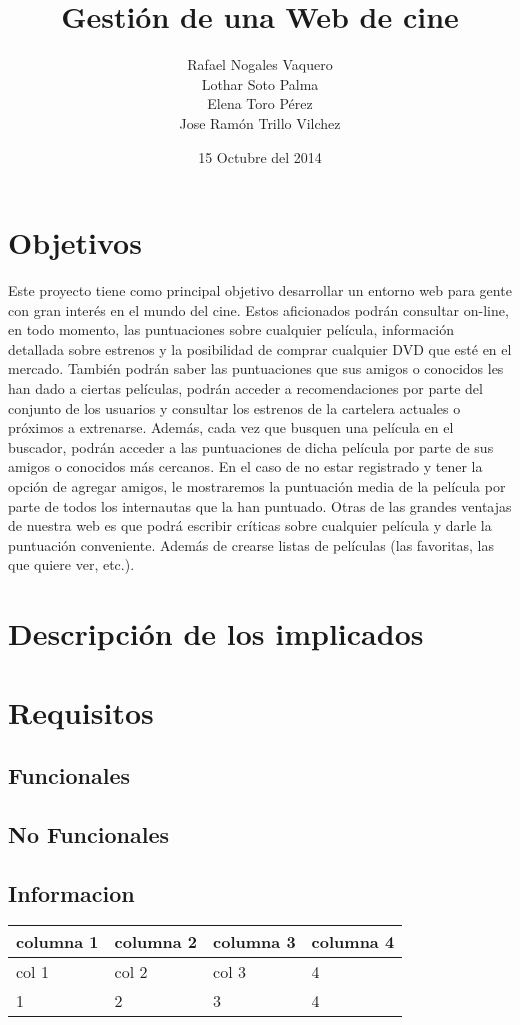 \documentclass{article}
\title{Gestión de una Web de cine}
\author{Rafael Nogales Vaquero
\\Lothar Soto Palma
\\Elena Toro Pérez
\\Jose Ramón Trillo Vilchez}
\date{15 Octubre del 2014}
\begin{document}
\maketitle

\section{Objetivos}

Este proyecto tiene como principal objetivo desarrollar un entorno web para gente con gran interés en el mundo del cine.
Estos aficionados podrán consultar on-line, en todo momento, las puntuaciones sobre cualquier película, información
detallada sobre estrenos y la posibilidad de comprar cualquier DVD que esté en el mercado.
También podrán saber las puntuaciones que sus amigos o conocidos les han dado a ciertas películas, podrán acceder a
recomendaciones por parte del conjunto de los usuarios y consultar los estrenos de la cartelera actuales o próximos a
extrenarse.
Además, cada vez que busquen una película en el buscador, podrán acceder a las puntuaciones de dicha película por parte de
sus amigos o conocidos más cercanos.
En el caso de no estar registrado y tener la opción de agregar amigos, le mostraremos la puntuación media de la película
por parte de todos los internautas que la han puntuado.
Otras de las grandes ventajas de nuestra web es que podrá escribir críticas sobre cualquier película y darle la puntuación
conveniente. Además de crearse listas de películas (las favoritas, las que quiere ver, etc.).
\section{Descripción de los implicados}
\section{Requisitos}
    \subsection{Funcionales}
    \subsection{No Funcionales}
    \subsection{Informacion}




\begin{tabular}{||l | l | l | l ||}
\hline
\hline
columna 1 & columna 2 & columna 3 & columna 4\\
\hline
col 1 & col 2 & col 3 & 4\\
\hline
1 & 2 & 3 & 4\\
\hline
\hline
\end{tabular}
\end{document}

